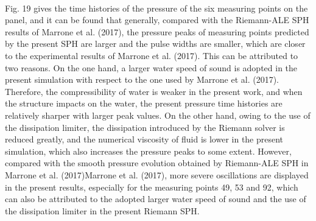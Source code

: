 \documentclass[UTF8]{ctexart}
\begin{document}
\paragraph{\quad}Fig. 19 gives the time histories of the pressure of the six measuring points on the panel, 
                and it can be found that generally, compared with the Riemann-ALE SPH results of 
                Marrone et al. (2017), the pressure peaks of measuring points predicted by the present 
                SPH are larger and the pulse widths are smaller, which are closer to the experimental 
                results of Marrone et al. (2017). This can be attributed to two reasons. On the one hand, 
                a larger water speed of sound is adopted in the present simulation with respect to the one 
                used by Marrone et al. (2017). Therefore, the compressibility of water is weaker in the 
                present work, and when the structure impacts on the water, the present pressure time histories 
                are relatively sharper with larger peak values. On the other hand, owing to the use of the 
                dissipation limiter, the dissipation introduced by the Riemann solver is reduced greatly, and 
                the numerical viscosity of fluid is lower in the present simulation, which also increases the 
                pressure peaks to some extent. However, compared with the smooth pressure evolution obtained 
                by Riemann-ALE SPH in Marrone et al. (2017)Marrone et al. (2017), more severe oscillations are 
                displayed in the present results, especially for the measuring points 49, 53 and 92, which can 
                also be attributed to the adopted larger water speed of sound and the use of the dissipation 
                limiter in the present Riemann SPH.
\end{document}
